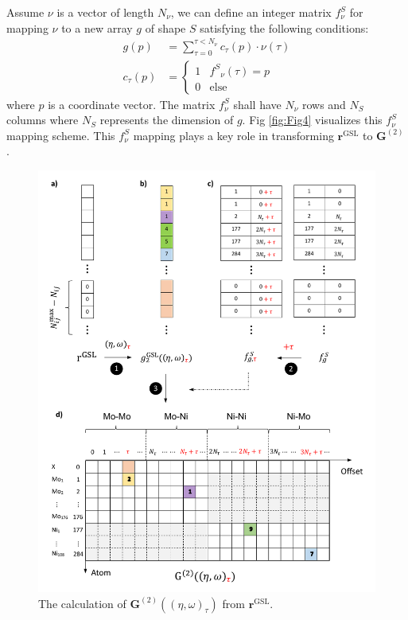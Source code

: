 \documentclass[final,1p,times]{elsarticle}
\begin{document}
Assume $\nu$ is a vector of length $N_{\nu}$, we can define an integer matrix 
$f^{S}_{\nu}$ for mapping $\nu$ to a new array $g$ of shape $S$ satisfying the 
following conditions:
\begin{align}
\label{eq:scatter_nd}
g(p) & = \sum_{\tau=0}^{\tau < N_{\nu}}{c_\tau(p) \cdot \nu(\tau)} \\
c_{\tau}(p) & = \begin{cases}
    1 & {f^S}_{\nu}(\tau) = p \\
    0 & \mathrm{else}
\end{cases}
\end{align}
where $p$ is a coordinate vector. The matrix $f^{S}_{\nu}$ shall have $N_{\nu}$ 
rows and $N_S$ columns where $N_S$ represents the dimension of $g$. 
Fig \ref{fig:Fig4} visualizes this $f^S_{\nu}$ mapping scheme. This $f^S_{\nu}$
mapping plays a key role in transforming $\mathbf{r}^{\mathrm{GSL}}$ to 
$\mathbf{G}^{(2)}$.

% 
%
\begin{figure}[h!]
\centering
\includegraphics[scale=0.75]{figures/Fig5.pdf}
\caption{\label{fig:Fig5} The calculation of 
$\mathbf{G}^{(2)}((\eta, \omega)_{\tau})$ from $\mathbf{r}^{\mathrm{GSL}}$. 
}
\end{figure}
\end{document}

